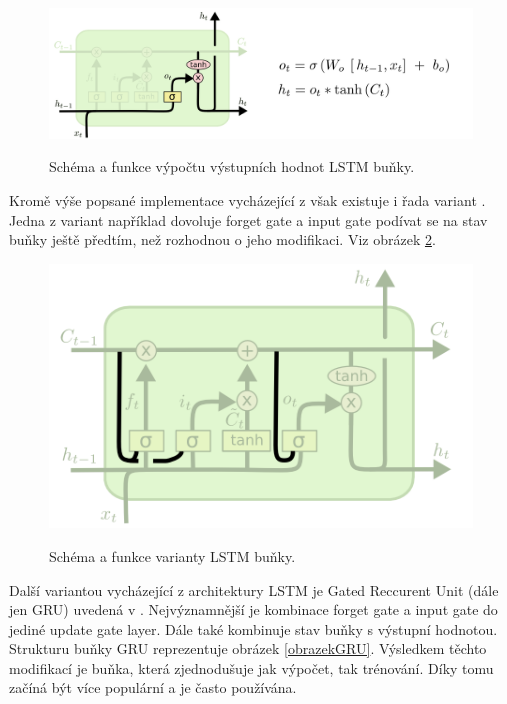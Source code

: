 \begin{figure}[h]\centering
    \centering
    \includegraphics[width=0.8\linewidth]{obrazky/LSTM3-focus-o.png}\\[1pt]  
    \caption{Schéma a funkce výpočtu výstupních hodnot LSTM buňky. \cite{colah_lstm}}    
    \label{obrazekLSTMOutput}
\end{figure}

Kromě výše popsané implementace vycházející z \cite{HochSchm97} však existuje i řada variant \cite{cho-etal-2014-learning, Gers_schmidhuber}.
Jedna z variant například dovoluje forget gate a input gate
podívat se na stav buňky ještě předtím, 
než rozhodnou o jeho modifikaci\cite{Gers_schmidhuber}.
Viz obrázek \ref{obrazekLSTMPeepholes}.

\begin{figure}[h]\centering
    \centering
    \includegraphics[width=0.8\linewidth]{obrazky/LSTM3-var-peepholes.png}\\[1pt]  
    \caption{Schéma a funkce varianty LSTM buňky. \cite{colah_lstm}}    
    \label{obrazekLSTMPeepholes}
\end{figure}

Další variantou vycházející z architektury LSTM
je Gated Reccurent Unit (dále jen GRU) uvedená v
\cite{cho-etal-2014-learning}.
Nejvýznamnější je kombinace forget gate a input gate 
do jediné update gate layer.
Dále také kombinuje stav buňky s výstupní hodnotou.
Strukturu buňky GRU reprezentuje obrázek \ref{obrazekGRU}.
Výsledkem těchto modifikací je buňka,
která zjednodušuje jak výpočet, tak trénování.
Díky tomu začíná být více populární a je často používána.

